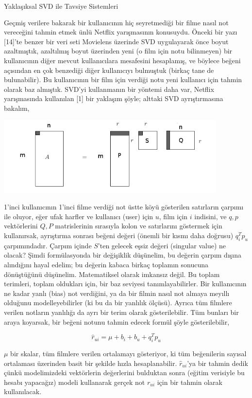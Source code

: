 \documentclass[12pt,fleqn]{article}\usepackage{../../common}
\begin{document}
Yaklaşıksal SVD ile Tavsiye Sistemleri

Geçmiş verilere bakarak bir kullanıcının hiç seyretmediği bir filme nasıl
not vereceğini tahmin etmek ünlü Netflix yarışmasının konusuydu. Önceki bir
yazı [14]'te benzer bir veri seti Movielens üzerinde SVD uygulayarak önce
boyut azaltmıştık, azaltılmış boyut üzerinden yeni (o film için notu
bilinmeyen) bir kullanıcının diğer mevcut kullanıcılara mesafesini
hesaplamış, ve böylece beğeni açısından en çok benzediği diğer kullanıcıyı
bulmuştuk (birkaç tane de bulunabilir). Bu kullanıcının bir film için
verdiği notu yeni kullanıcı için tahmin olarak baz almıştık. SVD'yi
kullanmanın bir yöntemi daha var, Netflix yarışmasında kullanılan [1] bir
yaklaşım şöyle; alttaki SVD ayrıştırmasına bakalım,

\includegraphics[height=4cm]{svdapprox_1.png}

1'inci kullanıcının 1'inci filme verdiği not üstte köyü gösterilen
satırların çarpımı ile oluyor, eğer ufak harfler ve kullanıcı (user) için
$u$, film için $i$ indisini, ve $q,p$ vektörlerini $Q,P$ matrislerinin
sırasıyla kolon ve satırlarını göstermek için kullanırsak, ayrıştırma
sonrası beğeni değeri (önemli bir kısmı daha doğrusu) $q_i^Tp_u$
çarpımındadır. Çarpım içinde $S$'ten gelecek eşsiz değeri (singular value)
ne olacak?  Şimdi formülasyonda bir değişiklik düşünelim, bu değerin çarpım
dışına alındığını hayal edelim; bu değerin kabaca birkaç toplamın sonucuna
dönüştüğünü düşünelim. Matematiksel olarak imkansız değil. Bu toplam
terimleri, toplam oldukları için, bir baz seviyesi tanımlayabilirler. Bir
kullanıcının ne kadar yanlı (bias) not verdiğini, ya da bir filmin nasıl
not almaya meyıllı olduğunu modelleyebilirler (ki bu da bir yanlılık
ölçüsü). Ayrıca tüm filmlere verilen notların yanlılığı da ayrı bir terim
olarak gösterilebilir. Tüm bunları bir araya koyarsak, bir beğeni notunu
tahmin edecek formül şöyle gösterilebilir,

$$
\hat{r}_{ui} = \mu + b_i + b_u + q_i^Tp_u
$$

$\mu$ bir skalar, tüm filmlere verilen ortalamayı gösteriyor, ki tüm beğenilerin
sayısal ortalaması üzerinden basit bir şekilde hızla
hesaplanabilir. $\hat{r}_{ui}$'ya bir tahmin dedik çünkü modelimizdeki
vektörlerin değerlerini bulduktan sonra (eğitim verisiyle bu hesabı yapacağız)
modeli kullanarak gerçek not $r_{ui}$ için bir tahmin olarak kullanılacak.
\end{document}
